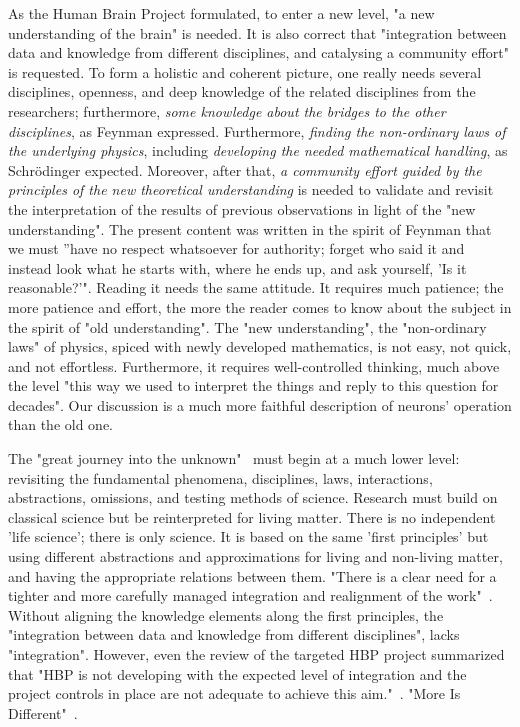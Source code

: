 As the Human Brain Project formulated, to enter a new level,
"a \hypertarget{NewUnderstanding}{new understanding} of the brain" is needed. It is also correct that "integration between data and knowledge from different disciplines, and catalysing a community effort" is requested. To form a holistic and coherent picture, one really needs several disciplines, openness, and deep knowledge of the related disciplines from the researchers; furthermore, \textit{some knowledge about the bridges to the other disciplines}, as Feynman expressed. Furthermore, \textit{finding the non-ordinary laws of the underlying physics},
including \textit{developing the needed mathematical handling}, as Schrödinger expected. Moreover, after that, \textit{a community effort guided by the principles of the new theoretical understanding} is needed to validate and revisit the interpretation of the results of previous observations in light of the "new understanding".
The present content was written in the spirit of Feynman that we  
 must ”have no respect whatsoever for authority; forget who said it and instead look what he starts with, where he ends up, and ask yourself, ’Is it reasonable?’". Reading it needs the same attitude.
It requires much patience; the more patience and effort, the more the reader comes to know about the subject in the spirit of "old understanding". The "new understanding", the "non-ordinary laws" of physics, spiced with newly developed mathematics,
is not easy, not quick, and not effortless. Furthermore, it requires well-controlled thinking, much above the level "this way we used to interpret the things and reply to this question for decades". Our discussion is a much more faithful description of neurons' operation than the old one.

The "great journey into the unknown"~\cite{BrainInitiative10:2024} must begin at a much lower level: revisiting the fundamental phenomena, disciplines, laws, interactions, abstractions, omissions, and testing methods of science. Research must build on classical science but be reinterpreted for living matter.
There is no independent 'life science'; there is only science. It is based on the same 'first principles' but using different abstractions and approximations for living and non-living matter, and having the appropriate relations between them.
"There is a
clear need for a tighter and more carefully managed integration and realignment of the work"~\cite{HBP_1st_Review:2015}.
Without aligning the knowledge elements along the first principles, the "integration between data and knowledge from different disciplines", lacks "integration".
However, even the review of the targeted \gls{HBP} project summarized that 
"\gls{HBP} is not developing with the expected level of integration and the project
controls in place are not adequate to achieve this aim."~\cite{HBP_1st_Review:2015}. "More Is Different"~\cite{MoreIsDifferent1972}.

